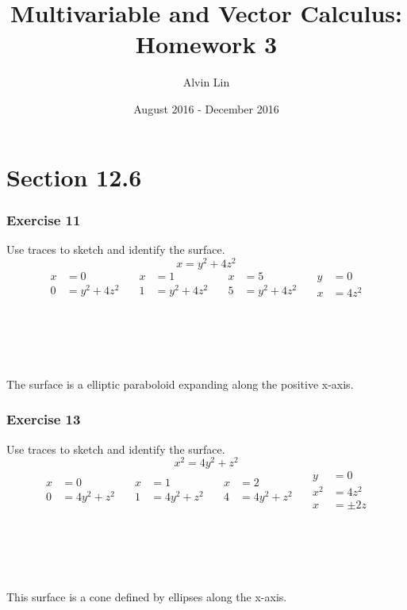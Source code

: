 \documentclass{math}
\title{Multivariable and Vector Calculus: Homework 3}
\author{Alvin Lin}
\date{August 2016 - December 2016}
\begin{document}
\maketitle

\section*{Section 12.6}

\subsubsection*{Exercise 11}
Use traces to sketch and identify the surface.
\[ x = y^2+4z^2 \]
\[\begin{split}
  x &= 0 \\
  0 &= y^2+4z^2
\end{split}\quad
\begin{split}
  x &= 1 \\
  1 &= y^2+4z^2
\end{split}\quad
\begin{split}
  x &= 5 \\
  5 &= y^2+4z^2
\end{split}\quad
\begin{split}
  y &= 0 \\
  x &= 4z^2
\end{split} \]
\\ \\ \\ \\ \\
The surface is a elliptic paraboloid expanding along the positive x-axis.

\subsubsection*{Exercise 13}
Use traces to sketch and identify the surface.
\[ x^2 = 4y^2+z^2 \]
\[\begin{split}
  x &= 0 \\
  0 &= 4y^2+z^2
\end{split}\quad
\begin{split}
  x &= 1 \\
  1 &= 4y^2+z^2
\end{split}\quad
\begin{split}
  x &= 2 \\
  4 &= 4y^2+z^2
\end{split}\quad
\begin{split}
  y &= 0 \\
  x^2 &= 4z^2 \\
  x &= \pm2z
\end{split} \]
\\ \\ \\ \\ \\
This surface is a cone defined by ellipses along the x-axis.
\end{document}
